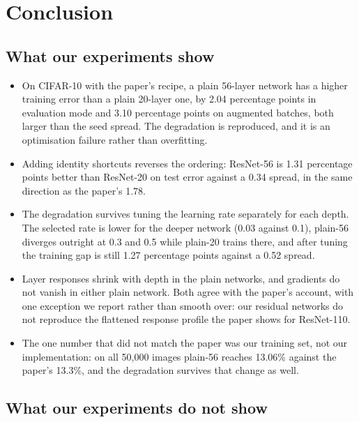 \documentclass[11pt,a4paper]{article}
\newcommand{\pp}{percentage points}
\begin{document}
\section{Conclusion}

\subsection*{What our experiments show}

\begin{itemize}
\item On CIFAR-10 with the paper's recipe, a plain 56-layer network has a higher
training error than a plain 20-layer one, by 2.04 \pp{} in evaluation mode and
3.10 \pp{} on augmented batches, both larger than the seed spread. The
degradation is reproduced, and it is an optimisation failure rather than
overfitting.
\item Adding identity shortcuts reverses the ordering: ResNet-56 is 1.31 \pp{}
better than ResNet-20 on test error against a 0.34 spread, in the same direction
as the paper's 1.78.
\item The degradation survives tuning the learning rate separately for each
depth. The selected rate is lower for the deeper network (0.03 against 0.1),
plain-56 diverges outright at 0.3 and 0.5 while plain-20 trains there, and after
tuning the training gap is still 1.27 \pp{} against a 0.52 spread.
\item Layer responses shrink with depth in the plain networks, and gradients do
not vanish in either plain network. Both agree with the paper's account, with
one exception we report rather than smooth over: our residual networks do not
reproduce the flattened response profile the paper shows for ResNet-110.
\item The one number that did not match the paper was our training set, not our
implementation: on all 50{,}000 images plain-56 reaches 13.06\% against the
paper's 13.3\%, and the degradation survives that change as well.
\end{itemize}

\subsection*{What our experiments do not show}
\end{document}
